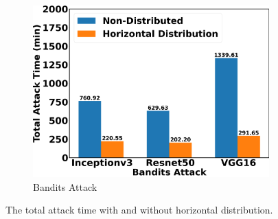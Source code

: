 \begin{figure}[tbp]
\begin{subfigure}[b]{0.32\textwidth}
    \includegraphics[width=\textwidth]{figures/chapter_classification/bandits_attack_horizontal_time.png}
    \caption{Bandits Attack}
    \label{fig:bandits_horizon}
\end{subfigure}
\caption{The total attack time with and without horizontal distribution.}
\label{fig.horizon_time}
\end{figure}

